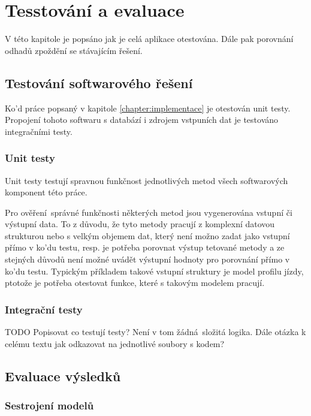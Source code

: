 
\chapter{Tesstování a evaluace}

V této kapitole je popsáno jak je celá aplikace otestována. Dále pak porovnání odhadů zpoždění se stávajícím řešení.

\section{Testování softwarového řešení}

Ko'd práce popsaný v kapitole \ref{chapter:implementace} je otestován unit testy. Propojení  tohoto softwaru s databází i zdrojem vstpuních dat je testováno integračními testy.

\subsection{Unit testy}

Unit testy testují spravnou funkčnost jednotlivých metod všech softwarových komponent této práce.

Pro ověření správné funkčnosti některých metod jsou vygenerována vstupní či výstupní data. To z důvodu, že tyto metody pracují z komplexní datovou strukturou nebo s velkým objemem dat, který není možno zadat jako vstupní přímo v ko'du testu, resp. je potřeba porovnat výstup tetované metody a ze stejných důvodů není možné uvádět výstupní hodnoty pro porovnání přímo v ko'du testu. Typickým příkladem takové vstupní struktury je model profilu jízdy, ptotože je potřeba otestovat funkce, které s takovým modelem pracují.

\subsection{Integrační testy}

TODO Popisovat co testují testy? Není v tom žádná složitá logika. Dále otázka k celému textu jak odkazovat na jednotlivé soubory s kodem?

\section{Evaluace výsledků}

\subsection{Sestrojení modelů}

